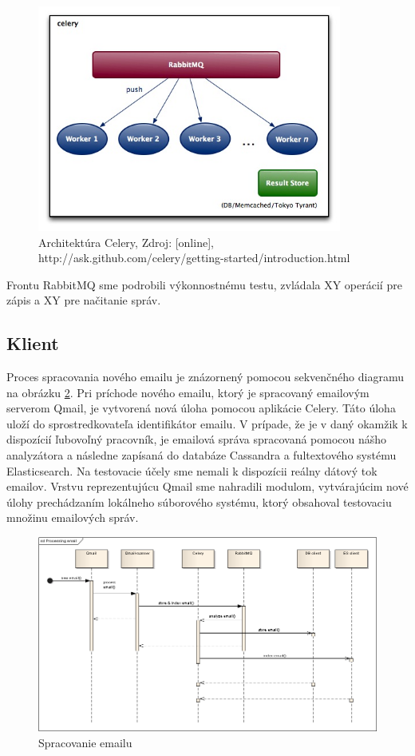 \documentclass[11pt,twoside,a4paper]{book}
\begin{document}
\begin{figure}[h]
 \centering
 \includegraphics[width=10cm]{./figures/Celery.jpg}
 \caption{Architektúra Celery, Zdroj: [online], http://ask.github.com/celery/getting-started/introduction.html}
 \label{fig:Celery}
\end{figure}

Frontu RabbitMQ sme podrobili výkonnostnému testu, zvládala XY operácií pre zápis a XY pre načitanie správ.

\subsection{Klient}

Proces spracovania nového emailu je znázornený pomocou sekvenčného diagramu na obrázku \ref{fig:Cseq}. Pri príchode nového emailu, ktorý je spracovaný emailovým serverom Qmail, je vytvorená nová úloha pomocou aplikácie Celery. Táto úloha uloží do sprostredkovateľa identifikátor emailu. V prípade, že je v daný okamžik k dispozícií ľubovoľný pracovník, je emailová správa spracovaná pomocou nášho analyzátora a následne zapísaná do databáze Cassandra a fultextového systému Elasticsearch. Na testovacie účely sme nemali k dispozícii reálny dátový tok emailov. Vrstvu reprezentujúcu Qmail sme nahradili modulom, vytvárajúcim nové úlohy prechádzaním lokálneho súborového systému, ktorý obsahoval testovaciu množinu emailových správ.


\begin{figure}[h]
 \centering
 \includegraphics[width=16cm]{./figures/emailProcessing.png}
 \caption{Spracovanie emailu}
 \label{fig:Cseq}
\end{figure}
\end{document}
